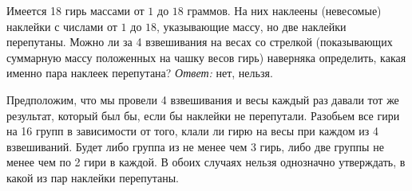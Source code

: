 \problem
Имеется 18 гирь массами от $1$ до $18$ граммов.
На них наклеены (невесомые) наклейки с числами от $1$ до $18$, указывающие
массу, но две наклейки перепутаны.
Можно ли за 4 взвешивания на весах со стрелкой
(показывающих суммарную массу положенных на чашку весов гирь)
наверняка определить, какая именно пара наклеек перепутана?
\solution
\emph{Ответ:} нет, нельзя.
\par
Предположим, что мы провели 4 взвешивания и весы каждый раз давали тот же
результат, который был бы, если бы наклейки не перепутали.
Разобьем все гири на 16 групп в зависимости от того, клали ли гирю на весы при
каждом из 4 взвешиваний.
Будет либо группа из не менее чем 3 гирь, либо две группы не менее чем по 2
гири в каждой.
В обоих случаях нельзя однозначно утверждать, в какой из пар наклейки
перепутаны.
\endproblem
